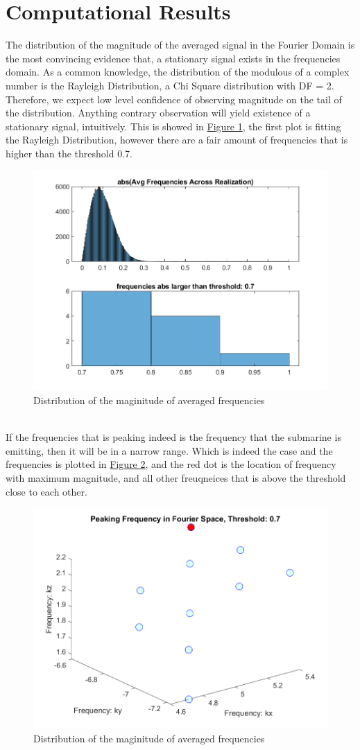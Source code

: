 \documentclass{article}
\begin{document}
\section{Computational Results}
    The distribution of the magnitude of the averaged signal in the Fourier Domain is the most convincing evidence that, a stationary signal exists in the frequencies domain. 
    As a common knowledge, the distribution of the modulous of a complex number is the Rayleigh Distribution, a Chi Square distribution with DF = 2. 
    Therefore, we expect low level confidence of observing magnitude on the tail of the distribution. Anything contrary observation will yield existence of a stationary signal, intuitively. This is showed in \hyperref[fig:frequencies-mag-distribution]{Figure 1}, the first plot is fitting the Rayleigh Distribution, however there are a fair amount of frequencies that is higher than the threshold 0.7. 
    \begin{figure}[h]
        \centering
        \includegraphics*[width=0.7\linewidth]{freq-distribution.png}
        \caption{Distribution of the maginitude of averaged frequencies}
        \label{fig:frequencies-mag-distribution}
    \end{figure}
    \\
    If the frequencies that is peaking indeed is the frequency that the submarine is emitting, then it will be in a narrow range. Which is indeed the case and the frequencies is plotted in \hyperref[fig:peaking-freq]{Figure 2}, and the red dot is the location of frequency with maximum magnitude, and all other freuqneices that is above the threshold close to each other. 
    \begin{figure}[h]
        \centering
        \includegraphics*[width=0.5\linewidth]{peaking-freq-position.png}
        \caption{Distribution of the maginitude of averaged frequencies}
        \label{fig:peaking-freq}
    \end{figure}
\end{document}
